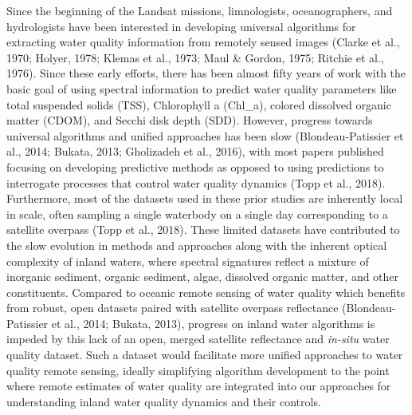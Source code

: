 \documentclass[]{article}
\begin{document}
Since the beginning of the Landsat missions, limnologists,
oceanographers, and hydrologists have been interested in developing
universal algorithms for extracting water quality information from
remotely sensed images (Clarke et al., 1970; Holyer, 1978; Klemas et
al., 1973; Maul \& Gordon, 1975; Ritchie et al., 1976). Since these
early efforts, there has been almost fifty years of work with the basic
goal of using spectral information to predict water quality parameters
like total suspended solids (TSS), Chlorophyll a (Chl\_a), colored
dissolved organic matter (CDOM), and Secchi disk depth (SDD). However,
progress towards universal algorithms and unified approaches has been
slow (Blondeau-Patissier et al., 2014; Bukata, 2013; Gholizadeh et al.,
2016), with most papers published focusing on developing predictive
methods as opposed to using predictions to interrogate processes that
control water quality dynamics (Topp et al., 2018). Furthermore, most of
the datasets used in these prior studies are inherently local in scale,
often sampling a single waterbody on a single day corresponding to a
satellite overpass (Topp et al., 2018). These limited datasets have
contributed to the slow evolution in methods and approaches along with
the inherent optical complexity of inland waters, where spectral
signatures reflect a mixture of inorganic sediment, organic sediment,
algae, dissolved organic matter, and other constituents. Compared to
oceanic remote sensing of water quality which benefits from robust, open
datasets paired with satellite overpass reflectance (Blondeau-Patissier
et al., 2014; Bukata, 2013), progress on inland water algorithms is
impeded by this lack of an open, merged satellite reflectance and
\emph{in-situ} water quality dataset. Such a dataset would facilitate
more unified approaches to water quality remote sensing, ideally
simplifying algorithm development to the point where remote estimates of
water quality are integrated into our approaches for understanding
inland water quality dynamics and their controls.
\end{document}
